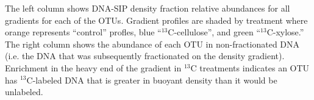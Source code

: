 The left column shows DNA-SIP density fraction relative abundances for all 
gradients for each of the OTUs. Gradient profiles are shaded by treatment where
orange represents ``control'' profles, blue ``$^{13}$C-cellulose'', and green ``$^{13}$C-xylose.'' The right column
shows the abundance of each OTU in non-fractionated DNA (i.e. the DNA that was subsequently fractionated on the
density gradient). Enrichment in the heavy end of the gradient in $^{13}$C treatments indicates
an OTU has $^{13}$C-labeled DNA that is greater in buoyant density than it would be unlabeled.
